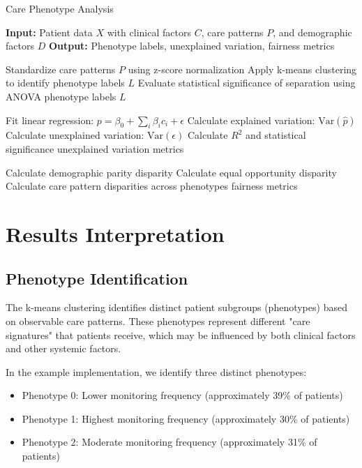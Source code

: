 \documentclass[12pt]{article}
\begin{document}
\begin{algorithm}[H]
\caption{Care Phenotype Analysis}
\begin{algorithmic}[1]
\State \textbf{Input:} Patient data $X$ with clinical factors $C$, care patterns $P$, and demographic factors $D$
\State \textbf{Output:} Phenotype labels, unexplained variation, fairness metrics

    \State Standardize care patterns $P$ using z-score normalization
    \State Apply k-means clustering to identify phenotype labels $L$
    \State Evaluate statistical significance of separation using ANOVA
    \State \Return phenotype labels $L$
\EndProcedure

        \State Fit linear regression: $p = \beta_0 + \sum_{i} \beta_i c_i + \epsilon$
        \State Calculate explained variation: $\text{Var}(\hat{p})$
        \State Calculate unexplained variation: $\text{Var}(\epsilon)$
        \State Calculate $R^2$ and statistical significance
    \EndFor
    \State \Return unexplained variation metrics
\EndProcedure

        \State Calculate demographic parity disparity
        \State Calculate equal opportunity disparity
    \EndFor
    \State Calculate care pattern disparities across phenotypes
    \State \Return fairness metrics
\EndProcedure
\end{algorithmic}
\end{algorithm}

\section{Results Interpretation}

\subsection{Phenotype Identification}

The k-means clustering identifies distinct patient subgroups (phenotypes) based on observable care patterns. These phenotypes represent different "care signatures" that patients receive, which may be influenced by both clinical factors and other systemic factors.

In the example implementation, we identify three distinct phenotypes:
\begin{itemize}
    \item Phenotype 0: Lower monitoring frequency (approximately 39\% of patients)
    \item Phenotype 1: Highest monitoring frequency (approximately 30\% of patients)
    \item Phenotype 2: Moderate monitoring frequency (approximately 31\% of patients)
\end{itemize}
\end{document}
